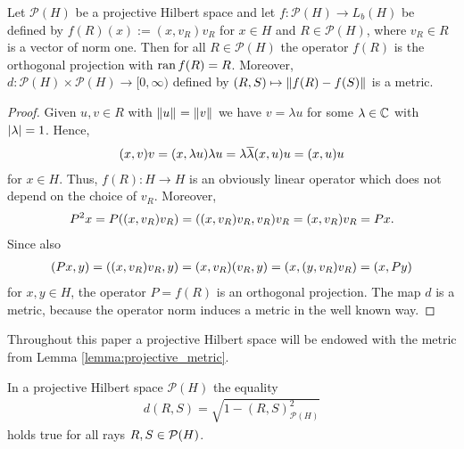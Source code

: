 \begin{lemma} \label{lemma:projective_metric}
	Let $\mathcal{P}(H)$ be a projective Hilbert space and let $f: \mathcal{P}(H) \to L_b(H)$ be defined by $f(R)(x) := (x,v_R)v_R$ for $x \in H$ and $R \in \mathcal{P}(H)$, where $v_R \in R$ is a vector of norm one. Then for all $R \in \mathcal{P}(H)$ the operator $f(R)$ is the orthogonal projection with $\operatorname{ran} f(R) = R$. Moreover, $d: \mathcal{P}(H) \times \mathcal{P}(H) \to [0, \infty)$ defined by $(R,S) \mapsto {\left \| f(R) - f(S) \right \|}_{}$ is a metric. 
\end{lemma}

\begin{proof}
	Given $u,v \in R$ with ${\left \| u \right \|}_{} = {\left \| v \right \|}_{}$ we have $v = \lambda u$ for some $\lambda \in \mathbb{C}$ with ${\left | \lambda \right |} = 1$. Hence,
	\begin{align*}
		{\left ( x,v \right )}v = {\left ( x, \lambda u \right )} \lambda u = \lambda \overline{\lambda} {\left ( x, u \right )} u = {\left ( x, u \right )} u 
	\end{align*}
	for $x \in H$. Thus, $f(R): H \to H$ is an obviously linear operator which does not depend on the choice of $v_R$. Moreover,
	\begin{align*}
		P^2x = P{\left ( (x, v_R) v_R \right )} = {\left ( (x, v_R) v_R, v_R \right )} v_R = (x,v_R) v_R = Px.
	\end{align*}
	Since also
	\begin{align*}
		(Px, y) = {\left ( (x, v_R) v_R, y \right )} = (x, v_R) (v_R, y) = {\left ( x, (y, v_R) v_R \right )} = (x, Py)
	\end{align*}
	for $x,y \in H$, the operator $P = f(R)$ is an orthogonal projection. The map $d$ is a metric, because the operator norm induces a metric in the well known way. 
\end{proof}


\begin{remark}
	Throughout this paper a projective Hilbert space will be endowed with the metric from Lemma \ref{lemma:projective_metric}. 
\end{remark}


\begin{lemma} \label{lemma:metric_representation}
	In a projective Hilbert space $\mathcal{P}(H)$ the equality 
	\begin{align*}
		d(R,S) = \sqrt{1 - (R,S)_{\mathcal{P}(H)}^2}
	\end{align*}
	holds true for all rays $R, S \in \mathcal{P}{\left ( H \right )}$.
\end{lemma}

